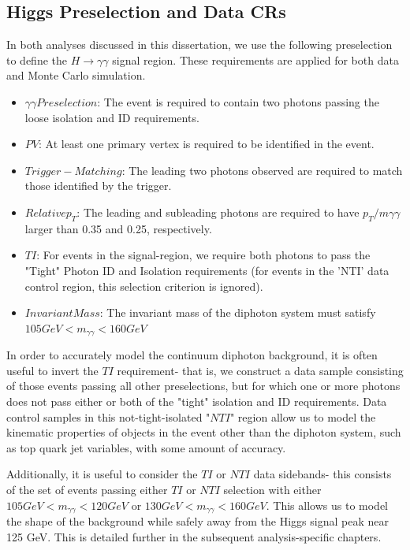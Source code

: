 \subsection{Higgs Preselection and Data CRs} \label{sec:Preselection} 

In both analyses discussed in this dissertation, we use the following preselection to define the $H \rightarrow \gamma \gamma$ signal region. These requirements are applied for both data and Monte Carlo simulation. 

\begin{itemize}
\item $\gamma\gamma Preselection$: The event is required to contain two photons passing the loose isolation and ID requirements.
\item $PV$: At least one primary vertex is required to be identified in the event.
\item $Trigger-Matching$: The leading two photons observed are required to match those identified by the trigger.
\item $Relative p_{T}$: The leading and subleading photons are required to have $p_{T}/m\gamma\gamma$ larger than 0.35 and 0.25, respectively.
\item $TI$: For events in the signal-region, we require both photons to pass the "Tight" Photon ID and Isolation requirements (for events in the 'NTI' data control region, this selection criterion is ignored). 
\item $Invariant Mass$: The invariant mass of the diphoton system must satisfy $105 GeV < m_{\gamma\gamma} < 160 GeV$
\end{itemize}

In order to accurately model the continuum diphoton background, it is often useful to invert the $TI$ requirement- that is, we construct a data sample consisting of those events passing all other preselections, but for which one or more photons does not pass either or both of the "tight" isolation and ID requirements. Data control samples in this not-tight-isolated "$NTI$" region allow us to model the kinematic properties of objects in the event other than the diphoton system, such as top quark jet variables, with some amount of accuracy.

Additionally, it is useful to consider the $TI$ or $NTI$ data sidebands- this consists of the set of events passing either $TI$ or $NTI$ selection with either $105 GeV < m_{\gamma\gamma} < 120 GeV$ or $130 GeV < m_{\gamma\gamma} < 160 GeV$. This allows us to model the shape of the background while safely away from the Higgs signal peak near 125 GeV. This is detailed further in the subsequent analysis-specific chapters.

